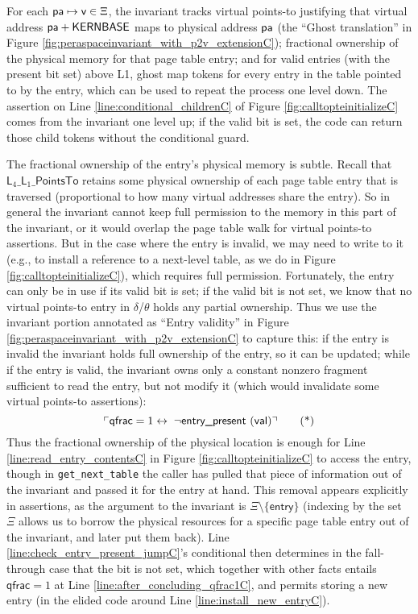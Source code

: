 For each $\textsf{pa}\mapsto \textsf{v} \in\Xi$, the invariant tracks virtual points-to justifying that virtual address $\textsf{pa}+\textsf{KERNBASE}$ maps to physical address $\textsf{pa}$
(the ``Ghost translation'' in Figure \ref{fig:peraspaceinvariant_with_p2v_extensionC});
fractional ownership of the physical memory for that page table entry;
and for valid entries (with the present bit set) above L1, ghost map tokens for every entry in the table pointed to by the entry, which can be used
to repeat the process one level down. 
The assertion on Line \ref{line:conditional_childrenC} of Figure \ref{fig:calltopteinitializeC} comes from the invariant one level up; 
if the valid bit is set,
the code can return those child tokens without the conditional guard.

The fractional ownership of the entry's physical memory is subtle. Recall that $\textsf{L}_{4}\_\textsf{L}_{1}\_\textsf{PointsTo}$ retains some physical
ownership of each page table entry that is traversed (proportional to how many virtual addresses share the entry).
So in general the invariant cannot keep full permission to the memory in this part of the invariant, or it would overlap the page table walk for virtual points-to
assertions. But in the case where the entry is invalid, we may need to write to it (e.g., to install a reference to a next-level table, as we do in Figure \ref{fig:calltopteinitializeC}),
which requires full permission. Fortunately, the entry can only be in use if its valid bit is set; if the valid bit is not set, we know
that no virtual points-to entry in $\delta$/$\theta$ holds any partial ownership.
Thus we use the invariant portion annotated as ``Entry validity'' in Figure \ref{fig:peraspaceinvariant_with_p2v_extensionC} to capture this:
if the entry is invalid the invariant holds full ownership of the entry, so it can be updated; while if the entry is valid,
the invariant owns only a constant nonzero fragment sufficient to read the entry, but not modify it (which would invalidate some virtual points-to assertions):
\begin{equation*}
 \ulcorner \textsf{qfrac} = 1 \leftrightarrow \; \lnot\textsf{entry\_present }(\textsf{val}) \urcorner \tag{*}
\end{equation*}
Thus the fractional ownership of the physical location is enough for Line \ref{line:read_entry_contentsC} in Figure \ref{fig:calltopteinitializeC} to access the entry, though in \lstinline|get_next_table|
the caller has pulled that piece of information out of the invariant and passed it for the entry at hand.
This removal appears explicitly in assertions,
as the argument to the invariant is $\Xi\setminus\{\mathsf{entry}\}$ (indexing by the set $\Xi$ allows us to borrow the physical resources
for a specific page table entry out of the invariant, and later put them back).
Line \ref{line:check_entry_present_jumpC}'s conditional then determines in the fall-through case that the bit is not set, which
together with other facts entails $\textsf{qfrac} = 1$ at Line \ref{line:after_concluding_qfrac1C},
and permits storing a new entry (in the elided code around Line \ref{line:install_new_entryC}).

